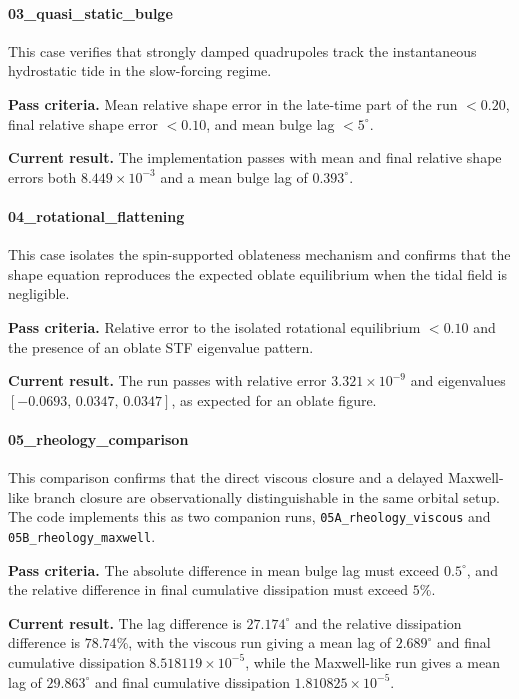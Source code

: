 \documentclass[journal, a4paper]{IEEEtran}
\begin{document}
\paragraph{03\_quasi\_static\_bulge}
This case verifies that strongly damped quadrupoles track the instantaneous
hydrostatic tide in the slow-forcing regime.
\par\smallskip
\textbf{Pass criteria.} Mean relative shape error in the late-time part of the
run $<0.20$, final relative shape error $<0.10$, and mean bulge lag
$<5^\circ$.
\par\smallskip
\textbf{Current result.} The implementation passes with mean and final
relative shape errors both $8.449\times10^{-3}$ and a mean bulge lag of
$0.393^\circ$.

\paragraph{04\_rotational\_flattening}
This case isolates the spin-supported oblateness mechanism and confirms that
the shape equation reproduces the expected oblate equilibrium when the tidal
field is negligible.
\par\smallskip
\textbf{Pass criteria.} Relative error to the isolated rotational equilibrium
$<0.10$ and the presence of an oblate STF eigenvalue pattern.
\par\smallskip
\textbf{Current result.} The run passes with relative error
$3.321\times10^{-9}$ and eigenvalues
$[-0.0693,\,0.0347,\,0.0347]$, as expected for an oblate figure.

\paragraph{05\_rheology\_comparison}
This comparison confirms that the direct viscous closure and a delayed
Maxwell-like branch closure are observationally distinguishable in the same
orbital setup. The code implements this as two companion runs,
\texttt{05A\_rheology\_viscous} and \texttt{05B\_rheology\_maxwell}.
\par\smallskip
\textbf{Pass criteria.} The absolute difference in mean bulge lag must exceed
$0.5^\circ$, and the relative difference in final cumulative dissipation must
exceed $5\%$.
\par\smallskip
\textbf{Current result.} The lag difference is $27.174^\circ$ and the relative
dissipation difference is $78.74\%$, with the viscous run giving a mean lag of
$2.689^\circ$ and final cumulative dissipation $8.518119\times10^{-5}$, while
the Maxwell-like run gives a mean lag of $29.863^\circ$ and final cumulative
dissipation $1.810825\times10^{-5}$.
\end{document}

